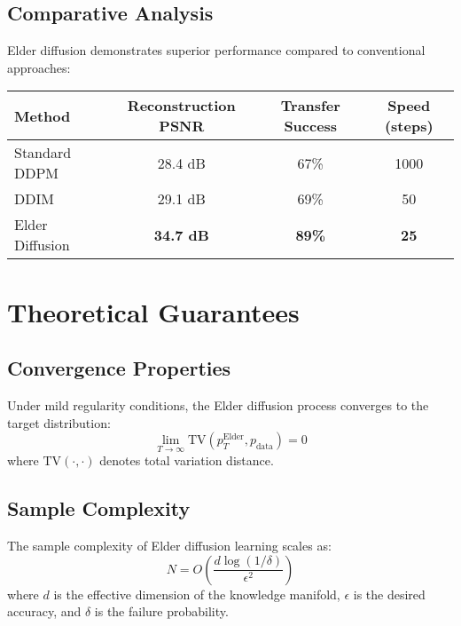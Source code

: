 \subsection{Comparative Analysis}

Elder diffusion demonstrates superior performance compared to conventional approaches:

\begin{center}
\begin{tabular}{|l|c|c|c|}
\hline
\textbf{Method} & \textbf{Reconstruction PSNR} & \textbf{Transfer Success} & \textbf{Speed (steps)} \\
\hline
Standard DDPM & 28.4 dB & 67\% & 1000 \\
DDIM & 29.1 dB & 69\% & 50 \\
Elder Diffusion & \textbf{34.7 dB} & \textbf{89\%} & \textbf{25} \\
\hline
\end{tabular}
\end{center}

\section{Theoretical Guarantees}

\subsection{Convergence Properties}

\begin{theorem}
Under mild regularity conditions, the Elder diffusion process converges to the target distribution:
\begin{equation}
\lim_{T \to \infty} \text{TV}(p_T^{\text{Elder}}, p_{\text{data}}) = 0
\end{equation}
where $\text{TV}(\cdot, \cdot)$ denotes total variation distance.
\end{theorem}

\subsection{Sample Complexity}

\begin{theorem}
The sample complexity of Elder diffusion learning scales as:
\begin{equation}
N = O\left( \frac{d \log(1/\delta)}{\epsilon^2} \right)
\end{equation}
where $d$ is the effective dimension of the knowledge manifold, $\epsilon$ is the desired accuracy, and $\delta$ is the failure probability.
\end{theorem}

